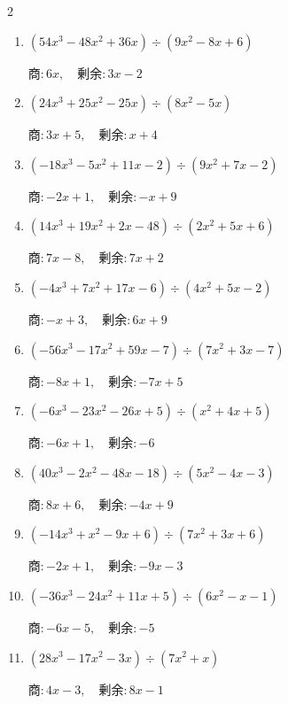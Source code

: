 \begin{multicols}{2}
\begin{enumerate}
  \item $(54x^{3}-48x^{2}+36x) \div (9x^{2}-8x+6)$

        $商 : 6x, \quad 剰余 : 3x-2$

\columnbreak %

\resetques

  \item $(24x^{3}+25x^{2}-25x) \div (8x^{2}-5x)$

        $商 : 3x+5, \quad 剰余 : x+4$

  \item $(-18x^{3}-5x^{2}+11x-2) \div (9x^{2}+7x-2)$

        $商 : -2x+1, \quad 剰余 : -x+9$

  \item $(14x^{3}+19x^{2}+2x-48) \div (2x^{2}+5x+6)$

        $商 : 7x-8, \quad 剰余 : 7x+2$

  \item $(-4x^{3}+7x^{2}+17x-6) \div (4x^{2}+5x-2)$

        $商 : -x+3, \quad 剰余 : 6x+9$

  \item $(-56x^{3}-17x^{2}+59x-7) \div (7x^{2}+3x-7)$

        $商 : -8x+1, \quad 剰余 : -7x+5$

\columnbreak %

  \item $(-6x^{3}-23x^{2}-26x+5) \div (x^{2}+4x+5)$

        $商 : -6x+1, \quad 剰余 : -6$

  \item $(40x^{3}-2x^{2}-48x-18) \div (5x^{2}-4x-3)$

        $商 : 8x+6, \quad 剰余 : -4x+9$

  \item $(-14x^{3}+x^{2}-9x+6) \div (7x^{2}+3x+6)$

        $商 : -2x+1, \quad 剰余 : -9x-3$

  \item $(-36x^{3}-24x^{2}+11x+5) \div (6x^{2}-x-1)$

        $商 : -6x-5, \quad 剰余 : -5$

  \item $(28x^{3}-17x^{2}-3x) \div (7x^{2}+x)$

        $商 : 4x-3, \quad 剰余 : 8x-1$

\columnbreak %

\resetques


\end{enumerate}
\end{multicols}
